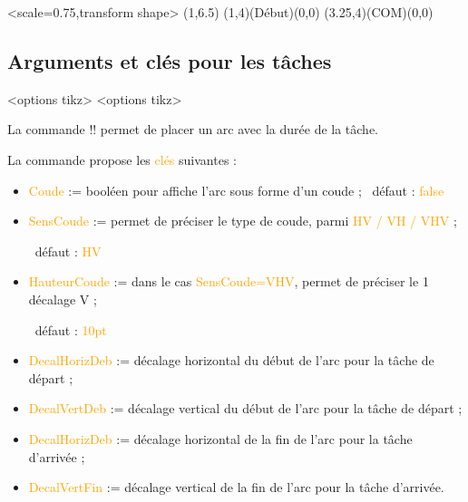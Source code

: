 \documentclass[french,a4paper,11pt]{article}
\newcommand\Cle[1]{{\small\sffamily\textlangle \textcolor{orange}{#1}\textrangle}}
\begin{document}
{{\begin{DemoCode}[]
\begin{GrapheMPM}[CouleurDates=green/orange,CouleurBords=brown,Grille={18,8}]%
	<scale=0.75,transform shape>
	\MPMPlaceNotice(1,6.5)
	\MPMPlaceTache(1,4)(Début)(0,0)
	\MPMPlaceTache(3.25,4)(COM)(0,0)
\end{GrapheMPM}
\end{DemoCode}

\pagebreak

\subsection{Arguments et clés pour les tâches}

\begin{DemoCode}
\begin{GrapheMPM}[clés]<options tikz>
	<options tikz>
\end{GrapheMPM}
\end{DemoCode}

\begin{tipblock}
La commande \motcletex!\MPMPlaceDuree! permet de placer un arc avec la durée de la tâche.

\smallskip

La commande propose les \Cle{clés} suivantes :

\begin{itemize}
	\item \Cle{Coude} := booléen pour affiche l'arc sous forme d'un coude ; \hfill~défaut : \Cle{false}
	\item \Cle{SensCoude} := permet de préciser le type de coude, parmi \Cle{HV / VH / VHV} ;

	\hfill~défaut : \Cle{HV}
	\item \Cle{HauteurCoude} := dans le cas \Cle{SensCoude=VHV}, permet de préciser le 1\ier{} décalage V ;

	\hfill~défaut : \Cle{10pt}
	\item \Cle{DecalHorizDeb} := décalage horizontal du début de l'arc pour la tâche de départ ;
	\item \Cle{DecalVertDeb} := décalage vertical du début de l'arc pour la tâche de départ ;
	\item \Cle{DecalHorizDeb} := décalage horizontal de la fin de l'arc pour la tâche d'arrivée ;
	\item \Cle{DecalVertFin} := décalage vertical de la fin de l'arc pour la tâche d'arrivée.


\end{itemize}
\end{tipblock}}}
\end{document}
